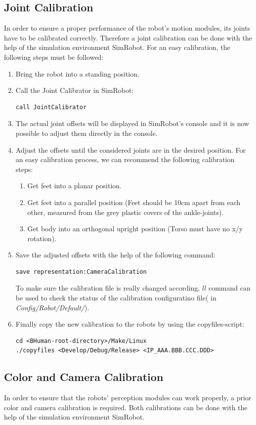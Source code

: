 \documentclass[a4paper]{article}
\begin{document}
\subsection{Joint Calibration}
In order to ensure a proper performance of the robot's motion modules, its joints have to be calibrated correctly. Therefore a joint calibration can be done with the help of the simulation environment SimRobot. For an easy calibration, the following steps must be followed:
\begin{enumerate}
\item Bring the robot into a standing position.
\item Call the Joint Calibrator in SimRobot:
\begin{lstlisting}
call JointCalibrator
\end{lstlisting}
\item The actual joint offsets will be displayed in SimRobot's console and it is now possible to adjust them directly in the console.
\item Adjust the offsets until the considered joints are in the desired position. For an easy calibration process, we can recommend the following calibration steps:
\begin{enumerate}
\item Get feet into a planar position.
\item Get feet into a parallel position (Feet should be 10cm apart from each other, measured from the grey plastic covers of the ankle-joints).
\item Get body into an orthogonal upright position (Torso must have no x/y rotation).
\end{enumerate}
\item Save the adjusted offsets with the help of the following command:
\begin{lstlisting}
save representation:CameraCalibration
\end{lstlisting}
To make sure the calibration file is really changed according, $ll$ command can be used to check the status of the calibration configuratino file( in \textit{Config/Robot/Default/}). 
\item Finally copy the new calibration to the robots by using the copyfiles-script:
\begin{lstlisting}
cd <BHuman-root-directory>/Make/Linux
./copyfiles <Develop/Debug/Release> <IP_AAA.BBB.CCC.DDD>
\end{lstlisting}
\end{enumerate}
\subsection{Color and Camera Calibration}
In order to ensure that the robots' perception modules can work properly, a prior color and camera calibration is required. Both calibrations can be done with the help of the simulation environment SimRobot.
\end{document}
